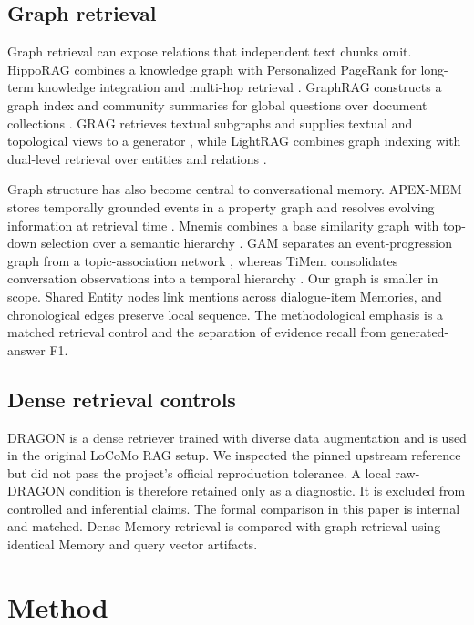 \documentclass[10pt,twocolumn]{article}
\begin{document}
\subsection{Graph retrieval}

Graph retrieval can expose relations that independent text chunks omit.
HippoRAG combines a knowledge graph with Personalized PageRank for long-term
knowledge integration and multi-hop retrieval
\citep{gutierrez2024hipporag}. GraphRAG constructs a graph index and community
summaries for global questions over document collections
\citep{edge2024graphrag}. GRAG retrieves textual subgraphs and supplies textual
and topological views to a generator \citep{hu2025grag}, while LightRAG
combines graph indexing with dual-level retrieval over entities and relations
\citep{guo2025lightrag}.

Graph structure has also become central to conversational memory. APEX-MEM
stores temporally grounded events in a property graph and resolves evolving
information at retrieval time \citep{banerjee2026apexmem}. Mnemis combines a
base similarity graph with top-down selection over a semantic hierarchy
\citep{tang2026mnemis}. GAM separates an event-progression graph from a
topic-association network \citep{wu2026gam}, whereas TiMem consolidates
conversation observations into a temporal hierarchy
\citep{li2026timem}. Our graph is smaller in scope. Shared Entity nodes link
mentions across dialogue-item Memories, and chronological edges preserve local
sequence. The methodological emphasis is a matched retrieval control and the
separation of evidence recall from generated-answer F1.

\subsection{Dense retrieval controls}

DRAGON is a dense retriever trained with diverse data augmentation
\citep{lin2023dragon} and is used in the original LoCoMo RAG setup. We
inspected the pinned upstream reference but did not pass the project's official
reproduction tolerance. A local raw-DRAGON condition is therefore retained
only as a diagnostic. It is excluded from controlled and inferential claims.
The formal comparison in this paper is internal and matched. Dense Memory
retrieval is compared with graph retrieval using identical Memory and query
vector artifacts.

\section{Method}
\end{document}
